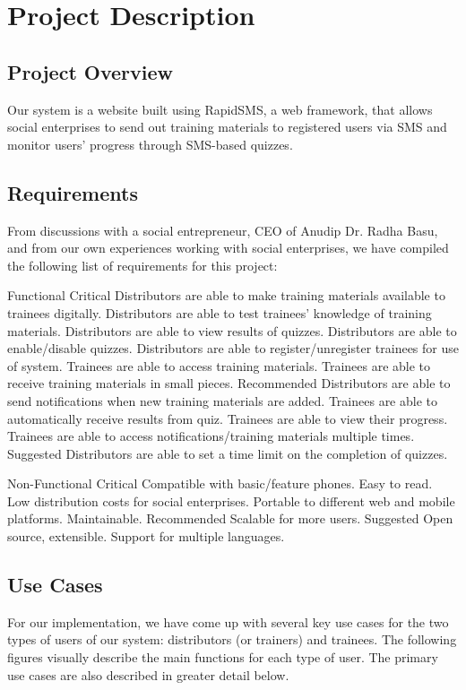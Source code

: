 \chapter{Project Description}

\section{Project Overview}
Our system is a website built using RapidSMS, a web framework, that allows social enterprises to send out training materials to registered users via SMS and monitor users’ progress through SMS-based quizzes.

\section{Requirements}
From discussions with a social entrepreneur, CEO of Anudip Dr. Radha Basu, and from our own experiences working with social enterprises, we have compiled the following list of requirements for this project:

Functional
Critical
Distributors are able to make training materials available to trainees digitally.
Distributors are able to test trainees’ knowledge of training materials.
Distributors are able to view results of quizzes.
Distributors are able to enable/disable quizzes.
Distributors are able to register/unregister trainees for use of system.
Trainees are able to access training materials.
Trainees are able to receive training materials in small pieces.
Recommended
Distributors are able to send notifications when new training materials are added.
Trainees are able to automatically receive results from quiz.
Trainees are able to view their progress.
Trainees are able to access notifications/training materials multiple times.
Suggested
Distributors are able to set a time limit on the completion of quizzes.

Non-Functional
Critical
Compatible with basic/feature phones.
Easy to read.
Low distribution costs for social enterprises.
Portable to different web and mobile platforms.
Maintainable.
Recommended
Scalable for more users.
Suggested
Open source, extensible.
Support for multiple languages.

\section{Use Cases}
For our implementation, we have come up with several key use cases for the two types of users of our system: distributors (or trainers) and trainees. The following figures visually describe the main functions for each type of user. The primary use cases are also described in greater detail below.

